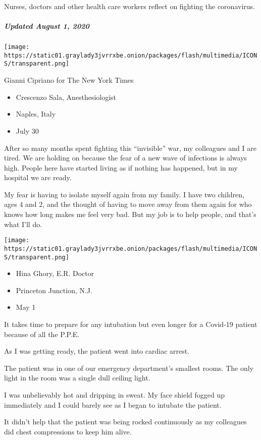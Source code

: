 Nurses, doctors and other health care workers reflect on fighting the
coronavirus.

\hypertarget{updated-august-1-2020-3}{%
\subparagraph{Updated August 1, 2020}\label{updated-august-1-2020-3}}

\texttt{[image: https://static01.graylady3jvrrxbe.onion/packages/flash/multimedia/ICONS/transparent.png]}

Gianni Cipriano for The New York Times

\begin{itemize}
\tightlist
\item
  Crescenzo Sala, Anesthesiologist
\item
  Naples, Italy
\item
  July 30
\end{itemize}

After so many months spent fighting this ``invisible'' war, my
colleagues and I are tired. We are holding on because the fear of a new
wave of infections is always high. People here have started living as if
nothing has happened, but in my hospital we are ready.

My fear is having to isolate myself again from my family. I have two
children, ages 4 and 2, and the thought of having to move away from them
again for who knows how long makes me feel very bad. But my job is to
help people, and that's what I'll do.

\texttt{[image: https://static01.graylady3jvrrxbe.onion/packages/flash/multimedia/ICONS/transparent.png]}

\begin{itemize}
\tightlist
\item
  Hina Ghory, E.R. Doctor
\item
  Princeton Junction, N.J.
\item
  May 1
\end{itemize}

It takes time to prepare for any intubation but even longer for a
Covid-19 patient because of all the P.P.E.

As I was getting ready, the patient went into cardiac arrest.

The patient was in one of our emergency department's smallest rooms. The
only light in the room was a single dull ceiling light.

I was unbelievably hot and dripping in sweat. My face shield fogged up
immediately and I could barely see as I began to intubate the patient.

It didn't help that the patient was being rocked continuously as my
colleagues did chest compressions to keep him alive.

